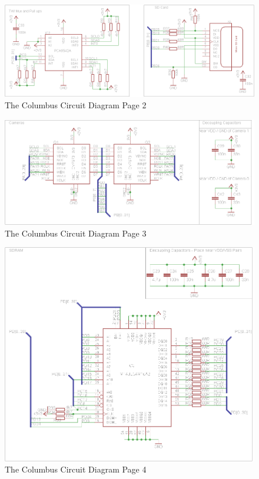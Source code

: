 \begin{figure}[ht!]
\centering
\includegraphics[angle = 90, width=\textwidth,height=\textheight,keepaspectratio]{./Figures/ColumbusCircuitPage2.png}
\caption{The Columbus Circuit Diagram Page 2}
\label{sch:Columbus_Schematic:2}
\end{figure}

\begin{figure}[ht!]
\centering
\includegraphics[angle = 90, width=\textwidth,height=\textheight,keepaspectratio]{./Figures/ColumbusCircuitPage3.png}
\caption{The Columbus Circuit Diagram Page 3}
\label{sch:Columbus_Schematic:3}
\end{figure}

\begin{figure}[ht!]
\centering
\includegraphics[angle = 90, width=\textwidth,height=\textheight,keepaspectratio]{./Figures/ColumbusCircuitPage4.png}
\caption{The Columbus Circuit Diagram Page 4}
\label{sch:Columbus_Schematic:4}
\end{figure}

